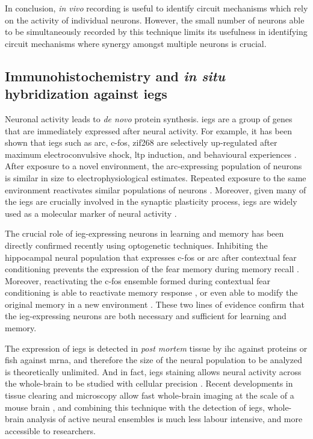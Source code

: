 In conclusion, \textit{in vivo} recording is useful to identify circuit mechanisms which rely on the activity of individual neurons. However, the small number of neurons able to be simultaneously recorded by this technique limits its usefulness in identifying circuit mechanisms where synergy amongst multiple neurons is crucial. 

\subsection{Immunohistochemistry and \textit{in situ} hybridization against \glspl{ieg}}
Neuronal activity leads to \textit{de novo} protein synthesis. \Glspl{ieg} are a group of genes that are immediately expressed after neural activity. For example, it has been shown that \glspl{ieg} such as \gls{arc}, c-fos, zif268 are selectively up-regulated after maximum electroconvulsive shock, \gls{ltp} induction, and behavioural experiences \citep{guzowski99, vann00, hall01}. After exposure to a novel environment, the \gls{arc}-expressing population of neurons is similar in size to electrophysiological estimates. Repeated exposure to the same environment reactivates similar populations of neurons \citep{guzowski06, niibori12}. Moreover, given many of the \glspl{ieg} are crucially involved in the synaptic plasticity process, \glspl{ieg} are widely used as a molecular marker of neural activity \citep{minatohara15}. 

The crucial role of \gls{ieg}-expressing neurons in learning and memory has been directly confirmed recently using optogenetic techniques. Inhibiting the hippocampal neural population that expresses c-fos or \gls{arc} after contextual fear conditioning prevents the expression of the fear memory during memory recall \citep{denny14, tanaka14}. Moreover, reactivating the c-fos ensemble formed during contextual fear conditioning is able to reactivate memory response \citep{liu12, cowansage14, ohkawa15}, or even able to modify the original memory in a new environment \citep{ramirez13, redondo14}. These two lines of evidence confirm that the \gls{ieg}-expressing neurons are both necessary and sufficient for learning and memory. 

The expression of \glspl{ieg} is detected in \textit{post mortem} tissue by \gls{ihc} against proteins or \gls{fish} against \gls{mrna}, and therefore the size of the neural population to be analyzed is theoretically unlimited. And in fact, \glspl{ieg} staining allows neural activity across the whole-brain to be studied with cellular precision \citep{wheeler13}. Recent developments in tissue clearing and microscopy allow fast whole-brain imaging at the scale of a mouse brain \citep{chung13, tomer14}, and combining this technique with the detection of \glspl{ieg}, whole-brain analysis of active neural ensembles is much less labour intensive, and more accessible to researchers.   

